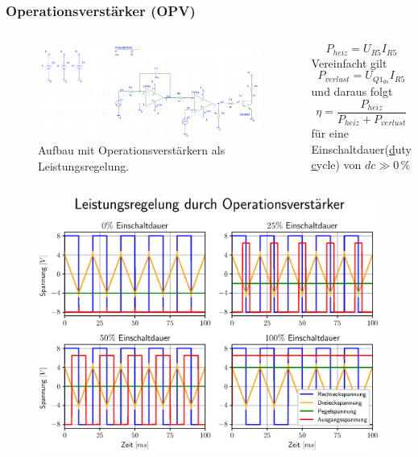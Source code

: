\documentclass{beamer}
\begin{document}
	\begin{frame}
		\frametitle{Operationsverstärker (OPV)}
		\begin{columns}
			\begin{figure}[tbh]
				\centering
				\includegraphics[width=1\linewidth , trim={10cm 0 0 0}]{medien/V2-0.png}
				\caption[Zweiter Aufbau]{Aufbau mit Operationsverstärkern als Leistungsregelung.}
			\end{figure}
			\begin{equation*}
				P_{heiz}=U_{R5}I_{R5}
			\end{equation*}
			Vereinfacht gilt
			\begin{equation*}
				P_{verlust}=U_{Q1_{ds}}I_{R5}
			\end{equation*}
			und daraus folgt
			\begin{equation*}
				\eta=\frac{P_{heiz}}{P_{heiz}+P_{verlust}}
			\end{equation*}
			für eine Einschaltdauer(\underline{d}uty \underline{c}ycle) von $dc \gg 0\,\%$
		\end{columns}
	\end{frame}
	\begin{frame}
		\begin{center}
			\begin{figure}[tbh]
				\centering
				\includegraphics[width=0.95\linewidth]{medien/2.eps}
			\end{figure}
		\end{center}
	\end{frame}
\end{document}
